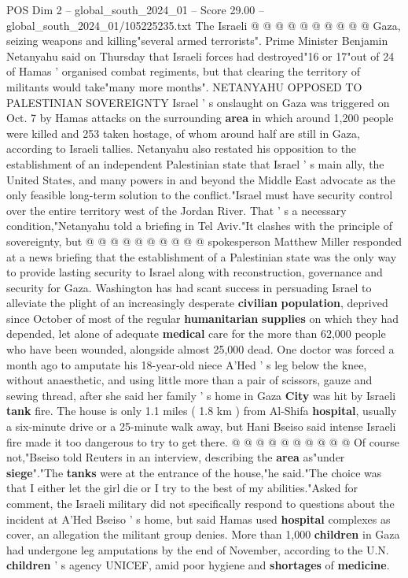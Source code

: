 \begin{textsample}{POS Dim 2 – global\_south\_2024\_01 – Score 29.00 – global\_south\_2024\_01/105225235.txt}
The Israeli @ @ @ @ @ @ @ @ @ @ Gaza, seizing weapons and killing"several armed terrorists".
Prime Minister Benjamin Netanyahu said on Thursday that Israeli forces had destroyed"16 or 17"out of 24 of Hamas ' organised combat regiments, but that clearing the territory of militants would take"many more months".
NETANYAHU OPPOSED TO PALESTINIAN SOVEREIGNTY Israel ' s onslaught on Gaza was triggered on Oct. 7 by Hamas attacks on the surrounding \textbf{area} in which around 1,200 people were killed and 253 taken hostage, of whom around half are still in Gaza, according to Israeli tallies.
Netanyahu also restated his opposition to the establishment of an independent Palestinian state that Israel ' s main ally, the United States, and many powers in and beyond the Middle East advocate as the only feasible long-term solution to the conflict."Israel must have security control over the entire territory west of the Jordan River.
That ' s a necessary condition,"Netanyahu told a briefing in Tel Aviv."It clashes with the principle of sovereignty, but @ @ @ @ @ @ @ @ @ @ spokesperson Matthew Miller responded at a news briefing that the establishment of a Palestinian state was the only way to provide lasting security to Israel along with reconstruction, governance and security for Gaza.
Washington has had scant success in persuading Israel to alleviate the plight of an increasingly desperate \textbf{civilian} \textbf{population}, deprived since October of most of the regular \textbf{humanitarian} \textbf{supplies} on which they had depended, let alone of adequate \textbf{medical} care for the more than 62,000 people who have been wounded, alongside almost 25,000 dead.
One doctor was forced a month ago to amputate his 18-year-old niece A'Hed ' s leg below the knee, without anaesthetic, and using little more than a pair of scissors, gauze and sewing thread, after she said her family ' s home in Gaza \textbf{City} was hit by Israeli \textbf{tank} fire.
The house is only 1.1 miles ( 1.8 km ) from Al-Shifa \textbf{hospital}, usually a six-minute drive or a 25-minute walk away, but Hani Bseiso said intense Israeli fire made it too dangerous to try to get there. @ @ @ @ @ @ @ @ @ @ Of course not,"Bseiso told Reuters in an interview, describing the \textbf{area} as"under \textbf{siege}"."The \textbf{tanks} were at the entrance of the house,"he said."The choice was that I either let the girl die or I try to the best of my abilities."Asked for comment, the Israeli military did not specifically respond to questions about the incident at A'Hed Bseiso ' s home, but said Hamas used \textbf{hospital} complexes as cover, an allegation the militant group denies.
More than 1,000 \textbf{children} in Gaza had undergone leg amputations by the end of November, according to the U.N. \textbf{children} ' s agency UNICEF, amid poor hygiene and \textbf{shortages} of \textbf{medicine}.

\end{textsample}
